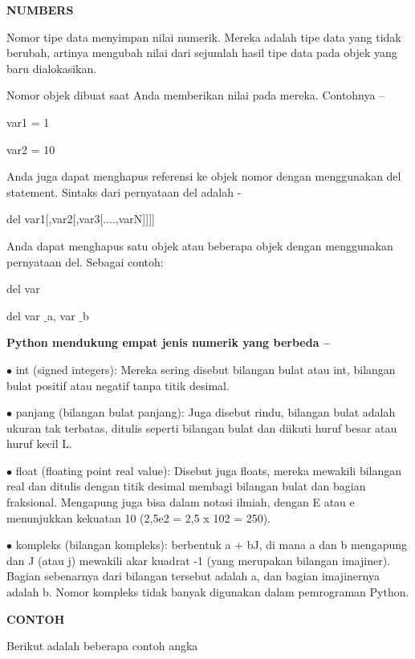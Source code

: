 \documentclass[a4paper,12pt]{report}
\begin{document}
\sloppy
\begin{center}\textbf{NUMBERS}\end{center} \par
\noindent 
\begin{center}\end{center}\vspace{12pt}
\noindent 
Nomor tipe data menyimpan nilai numerik. Mereka adalah tipe data yang tidak berubah, artinya mengubah nilai dari sejumlah hasil tipe data pada objek yang baru dialokasikan. \par
\noindent 
Nomor objek dibuat saat Anda memberikan nilai pada mereka. Contohnya – \par
\noindent 
\vspace{12pt}
\noindent 
var1 = 1 \par
\noindent 
var2 = 10 \par
\noindent 
Anda juga dapat menghapus referensi ke objek nomor dengan menggunakan del statement. Sintaks dari pernyataan del adalah - \par
\noindent 
\vspace{12pt}
\noindent 
del var1[,var2[,var3[....,varN]]]] \par
\noindent 
Anda dapat menghapus satu objek atau beberapa objek dengan menggunakan pernyataan del. Sebagai contoh: \par
\noindent 
\vspace{12pt}
\noindent 
del var \par
\noindent 
del var $  \_  $a, var $  \_  $b \par
\noindent 
\textbf{Python mendukung empat jenis numerik yang berbeda –} \par
\noindent 
\vspace{12pt}
\noindent 
 $ \bullet $ int (signed integers): Mereka sering disebut bilangan bulat atau int, bilangan bulat positif atau negatif tanpa titik desimal. \par
\noindent 
 $ \bullet $ panjang (bilangan bulat panjang): Juga disebut rindu, bilangan bulat adalah ukuran tak terbatas, ditulis seperti bilangan bulat dan diikuti huruf besar atau huruf kecil L. \par
\noindent 
 $ \bullet $ float (floating point real value): Disebut juga floats, mereka mewakili bilangan real dan ditulis dengan titik desimal membagi bilangan bulat dan bagian fraksional. Mengapung juga bisa dalam notasi ilmiah, dengan E atau e menunjukkan kekuatan 10 (2,5e2 = 2,5 x 102 = 250). \par
\noindent 
 $ \bullet $ kompleks (bilangan kompleks): berbentuk a + bJ, di mana a dan b mengapung dan J (atau j) mewakili akar kuadrat -1 (yang merupakan bilangan imajiner). Bagian sebenarnya dari bilangan tersebut adalah a, dan bagian imajinernya adalah b. Nomor kompleks tidak banyak digunakan dalam pemrograman Python. \par
\noindent 
\textbf{CONTOH} \par
\noindent 
Berikut adalah beberapa contoh angka \par
\noindent 
\vspace{12pt}
\end{document}
